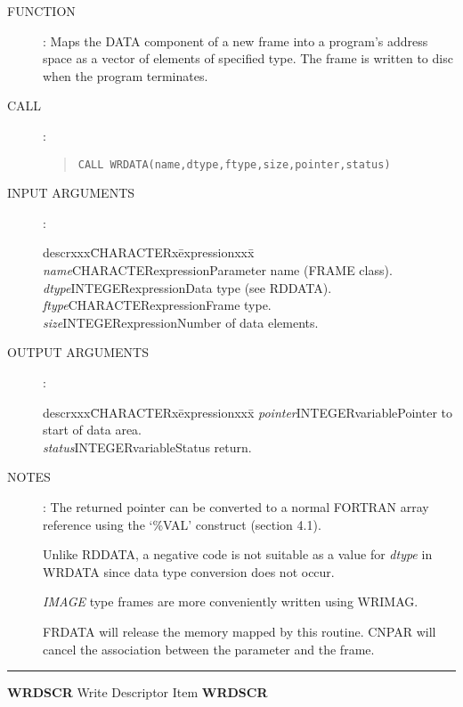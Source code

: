 \documentclass{article}
\begin{document}
\begin{description}
\item [FUNCTION]:
Maps the DATA component of a new frame into a program's address space as a
vector of elements of specified type.
The frame is written to disc when the program terminates.
\item [CALL]:
\begin{quote}
{\tt CALL WRDATA(name,dtype,ftype,size,pointer,status)}
\end{quote}
\item [INPUT ARGUMENTS]:
\begin{tabbing}
descrxxx\=CHARACTERx\=expressionxxx\=\kill
{\em name}\>CHARACTER\>expression\>Parameter name (FRAME class).\\
{\em dtype}\>INTEGER\>expression\>Data type (see RDDATA).\\
{\em ftype}\>CHARACTER\>expression\>Frame type.\\
{\em size}\>INTEGER\>expression\>Number of data elements.
\end{tabbing}
\item [OUTPUT ARGUMENTS]:
\begin{tabbing}
descrxxx\=CHARACTERx\=expressionxxx\=\kill
{\em pointer}\>INTEGER\>variable\>Pointer to start of data area.\\
{\em status}\>INTEGER\>variable\>Status return.
\end{tabbing}
\item [NOTES]:
The returned pointer can be converted to a normal FORTRAN array reference using
the `\%VAL' construct (section 4.1).

Unlike RDDATA, a negative code is not suitable as a value for {\em dtype} in
WRDATA since data type conversion does not occur.

{\em IMAGE} type frames are more conveniently written using WRIMAG.

FRDATA will release the memory mapped by  this routine.
CNPAR will cancel the association between the parameter and the frame.
\end{description}
\rule{\textwidth}{0.3mm}
{\Large {\bf WRDSCR} \hfill Write Descriptor Item \hfill {\bf WRDSCR}}
\end{document}
